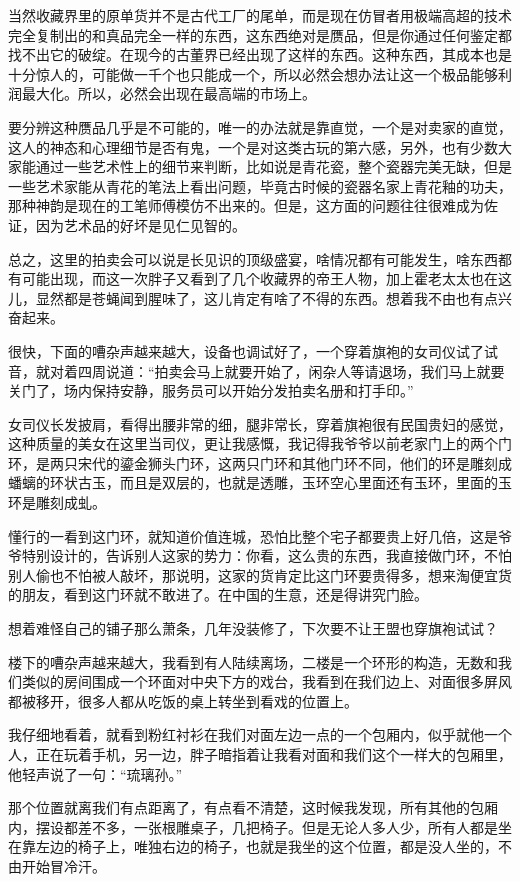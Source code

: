当然收藏界里的原单货并不是古代工厂的尾单，而是现在仿冒者用极端高超的技术完全复制出的和真品完全一样的东西，这东西绝对是赝品，但是你通过任何鉴定都找不出它的破绽。在现今的古董界已经出现了这样的东西。这种东西，其成本也是十分惊人的，可能做一千个也只能成一个，所以必然会想办法让这一个极品能够利润最大化。所以，必然会出现在最高端的市场上。

要分辨这种赝品几乎是不可能的，唯一的办法就是靠直觉，一个是对卖家的直觉，这人的神态和心理细节是否有鬼，一个是对这类古玩的第六感，另外，也有少数大家能通过一些艺术性上的细节来判断，比如说是青花瓷，整个瓷器完美无缺，但是一些艺术家能从青花的笔法上看出问题，毕竟古时候的瓷器名家上青花釉的功夫，那种神韵是现在的工笔师傅模仿不出来的。但是，这方面的问题往往很难成为佐证，因为艺术品的好坏是见仁见智的。

总之，这里的拍卖会可以说是长见识的顶级盛宴，啥情况都有可能发生，啥东西都有可能出现，而这一次胖子又看到了几个收藏界的帝王人物，加上霍老太太也在这儿，显然都是苍蝇闻到腥味了，这儿肯定有啥了不得的东西。想着我不由也有点兴奋起来。

很快，下面的嘈杂声越来越大，设备也调试好了，一个穿着旗袍的女司仪试了试音，就对着四周说道：“拍卖会马上就要开始了，闲杂人等请退场，我们马上就要关门了，场内保持安静，服务员可以开始分发拍卖名册和打手印。”

女司仪长发披肩，看得出腰非常的细，腿非常长，穿着旗袍很有民国贵妇的感觉，这种质量的美女在这里当司仪，更让我感慨，我记得我爷爷以前老家门上的两个门环，是两只宋代的鎏金狮头门环，这两只门环和其他门环不同，他们的环是雕刻成蟠螭的环状古玉，而且是双层的，也就是透雕，玉环空心里面还有玉环，里面的玉环是雕刻成虬。

懂行的一看到这门环，就知道价值连城，恐怕比整个宅子都要贵上好几倍，这是爷爷特别设计的，告诉别人这家的势力：你看，这么贵的东西，我直接做门环，不怕别人偷也不怕被人敲坏，那说明，这家的货肯定比这门环要贵得多，想来淘便宜货的朋友，看到这门环就不敢进了。在中国的生意，还是得讲究门脸。

想着难怪自己的铺子那么萧条，几年没装修了，下次要不让王盟也穿旗袍试试？

楼下的嘈杂声越来越大，我看到有人陆续离场，二楼是一个环形的构造，无数和我们类似的房间围成一个环面对中央下方的戏台，我看到在我们边上、对面很多屏风都被移开，很多人都从吃饭的桌上转坐到看戏的位置上。

我仔细地看着，就看到粉红衬衫在我们对面左边一点的一个包厢内，似乎就他一个人，正在玩着手机，另一边，胖子暗指着让我看对面和我们这个一样大的包厢里，他轻声说了一句：“琉璃孙。”

那个位置就离我们有点距离了，有点看不清楚，这时候我发现，所有其他的包厢内，摆设都差不多，一张根雕桌子，几把椅子。但是无论人多人少，所有人都是坐在靠左边的椅子上，唯独右边的椅子，也就是我坐的这个位置，都是没人坐的，不由开始冒冷汗。

